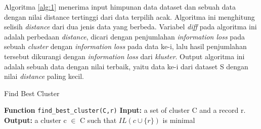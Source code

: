 \documentclass[a4paper,twoside]{article}
\begin{document}
\begin{enumerate}
Algoritma \ref{alg:1} menerima input himpunan data dataset dan sebuah data dengan nilai distance tertinggi dari data terpilih acak. Algoritma ini menghitung selisih \textit{distance} dari dua jenis data yang berbeda. Variabel \textit{diff} pada algoritma ini adalah perbedaan \textit{distance}, dicari dengan penjumlahan \textit{information loss} pada sebuah \textit{cluster} dengan \textit{information loss} pada data ke-i, lalu hasil penjumlahan tersebut dikurangi dengan \textit{information loss} dari \textit{kluster}. Output algoritma ini adalah sebuah data dengan nilai terbaik, yaitu data ke-i dari dataset S dengan nilai \textit{distance} paling kecil.
\begin{tcolorbox}[blanker,width=(\linewidth-0.5cm)]
\begin{algorithm}[H]
  \caption{Find Best Cluster}\label{alg:2}
  \begin{algorithmic}[1]
  \State \textbf{Function} \texttt{find\_best\_cluster(C,r)}
  \State \textbf{Input:} a set of cluster C and a record r.
  \State \textbf{Output:} a cluster c $\in$ C such that $IL(c \cup \{r\})$ is minimal
  \\
  \EndIf
  \EndFor
  \end{algorithmic}
\end{algorithm}
\end{tcolorbox}


\end{enumerate}
\end{document}
